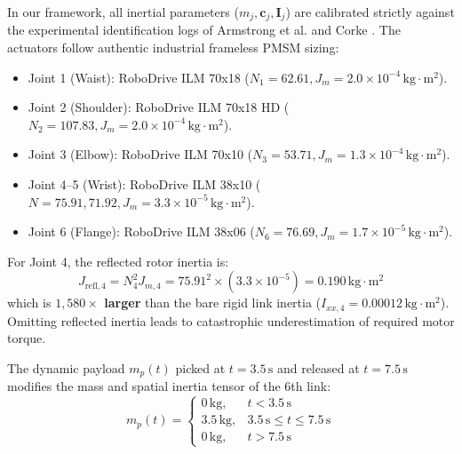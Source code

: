 \documentclass[journal,10pt,twocolumn]{IEEEtran}
\begin{document}
In our framework, all inertial parameters ($m_j, \bm{c}_j, \bm{I}_j$) are calibrated strictly against the experimental identification logs of Armstrong et al. \cite{armstrong1988experimental} and Corke \cite{corke1996robot}. The actuators follow authentic industrial frameless PMSM sizing:
\begin{itemize}
    \item Joint 1 (Waist): RoboDrive ILM 70x18 ($N_1 = 62.61, J_m = 2.0\times 10^{-4}\,\text{kg}\cdot\text{m}^2$).
    \item Joint 2 (Shoulder): RoboDrive ILM 70x18 HD ($N_2 = 107.83, J_m = 2.0\times 10^{-4}\,\text{kg}\cdot\text{m}^2$).
    \item Joint 3 (Elbow): RoboDrive ILM 70x10 ($N_3 = 53.71, J_m = 1.3\times 10^{-4}\,\text{kg}\cdot\text{m}^2$).
    \item Joint 4--5 (Wrist): RoboDrive ILM 38x10 ($N = 75.91, 71.92, J_m = 3.3\times 10^{-5}\,\text{kg}\cdot\text{m}^2$).
    \item Joint 6 (Flange): RoboDrive ILM 38x06 ($N_6 = 76.69, J_m = 1.7\times 10^{-5}\,\text{kg}\cdot\text{m}^2$).
\end{itemize}
For Joint 4, the reflected rotor inertia is:
\begin{equation}
    J_{\text{refl},4} = N_4^2 J_{m,4} = 75.91^2 \times (3.3\times 10^{-5}) = 0.190\,\text{kg}\cdot\text{m}^2
\end{equation}
which is \textbf{$1,580\times$ larger} than the bare rigid link inertia ($I_{xx,4} = 0.00012\,\text{kg}\cdot\text{m}^2$). Omitting reflected inertia leads to catastrophic underestimation of required motor torque.

The dynamic payload $m_p(t)$ picked at $t = 3.5\,\text{s}$ and released at $t = 7.5\,\text{s}$ modifies the mass and spatial inertia tensor of the 6th link:
\begin{equation}
    m_p(t) = 
    \begin{cases}
        0\,\text{kg}, & t < 3.5\,\text{s} \\
        3.5\,\text{kg}, & 3.5\,\text{s} \le t \le 7.5\,\text{s} \\
        0\,\text{kg}, & t > 7.5\,\text{s}
    \end{cases}
\end{equation}
\end{document}
